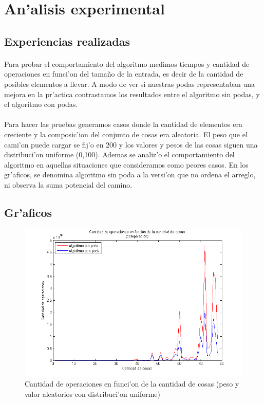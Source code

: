 \section{An'alisis experimental}
\subsection{Experiencias realizadas}
\paragraph{}
Para probar el comportamiento del algoritmo medimos tiempos y cantidad de operaciones en funci'on del tama\~{n}o de la 
entrada, es decir de la cantidad de posibles elementos a llevar. A modo de ver si nuestras podas representaban una mejora
en la pr'actica contrastamos los resultados entre el algoritmo sin podas, y el algoritmo con podas. 
\paragraph{}
Para hacer las pruebas generamos casos donde la cantidad de elementos era creciente y la composic'ion del conjunto de cosas era 
aleatoria. El peso que el cami'on puede cargar se fij'o en 200 y los valores y pesos de las cosas siguen una distribuci'on 
uniforme (0,100). Ademas se analiz'o el comportamiento del algoritmo en aquellas situaciones que consideramos como peores 
casos. En los gr'aficos, se denomina algoritmo sin poda a la versi'on que no ordena el arreglo, ni observa la suma potencial 
del camino.

\newpage
\subsection{Gr'aficos}

\begin{figure}[H]
\centering
\includegraphics[scale=0.7]{../../codigo/ejercicio2/benchmark/graficos/comparacion_con_poda_sin_poda/caso_promedio/comparacionCantOpConPodaSinPoda.png}
\caption{Cantidad de operaciones en funci'on de la cantidad de cosas (peso y valor aleatorios con distribuci'on uniforme)}
\label{Ej2fig1}
\end{figure}

